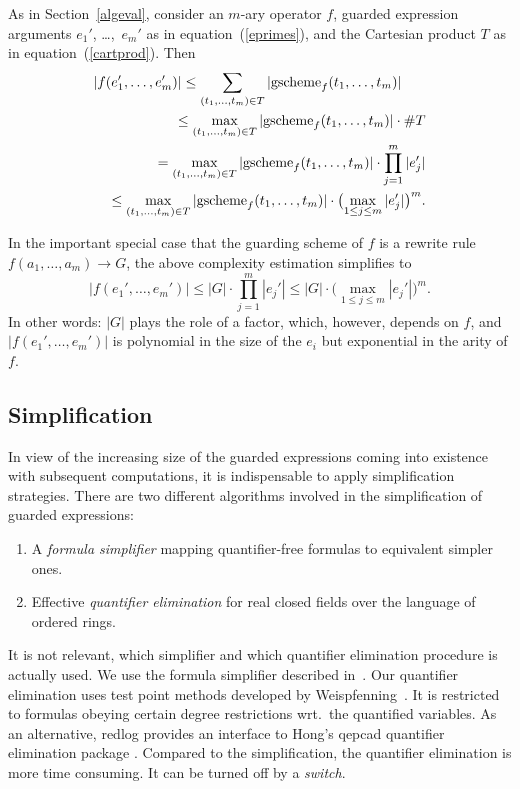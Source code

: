 As in Section~\ref{algeval}, consider an $m$-ary operator $f$,
guarded expression arguments $e_1'$, \dots,~$e_m'$ as in
equation~(\ref{eprimes}), and the Cartesian product $T$ as in
equation~(\ref{cartprod}). Then
\begin{eqnarray*}
\lefteqn{
|f(e_1',\ldots,e_m')| \leq  \sum_{(t_1,\dots,t_m)\in
T}|\gscheme_f(t_1,\dots,t_m)|}\\
& &{}\leq  \max_{(t_1,\ldots,t_m)\in
T}|\gscheme_f(t_1,\ldots,t_m)|\cdot \#T\\
& & {}=  \max_{(t_1,\ldots,t_m)\in
T}|\gscheme_f(t_1,\ldots,t_m)|\cdot \prod_{j=1}^m|e_j'|\\
& & {}\leq  \max_{(t_1,\ldots,t_m)\in
T}|\gscheme_f(t_1,\ldots,t_m)|\cdot\bigl(\max_{1\leq j\leq m}|e_j'|\bigr)^m.
\end{eqnarray*}

In the important special case that the guarding scheme of $f$ is a
rewrite rule $f(a_1,\ldots,a_m)\to G$, the above complexity
estimation simplifies to
$$
|f(e_1',\ldots,e_m')| \leq  |G|\cdot \prod_{j=1}^m|e_j'| \leq  |G|\cdot
\bigl(\max_{1\leq j\leq m}|e_j'|\bigr)^m.
$$
In other words: $|G|$ plays the role of a factor, which, however,
depends on $f$, and $|f(e_1',\ldots,e_m')|$ is polynomial in the size
of the $e_i$ but exponential in the arity of $f$.

%
\subsection{Simplification}
In view of the increasing size of the guarded expressions coming into
existence with subsequent computations, it is indispensable to apply
simplification strategies. There are two different algorithms involved
in the simplification of guarded expressions:
\begin{enumerate}
\item
A {\em formula simplifier} mapping quantifier-free formulas to
equivalent simpler ones.
\item
Effective {\em quantifier elimination} for real closed fields
over the language of ordered rings.
\end{enumerate}

It is not relevant, which simplifier and which quantifier elimination
procedure is actually used. We use the formula simplifier described
in~\cite{DolzmannSturm:95}. Our quantifier elimination uses test point
methods developed by
Weispfenning~\cite{Weispfenning:88,LoosWeispfenning:93,Weispfenning:96}.
It is restricted to formulas obeying certain degree restrictions
wrt.~the quantified variables. As an alternative, {\sc redlog}
provides an interface to Hong's {\sc qepcad} quantifier elimination
package \cite{Hong:93}. Compared to the simplification, the
quantifier elimination is more time consuming. It can be turned off by
a {\em switch}.

